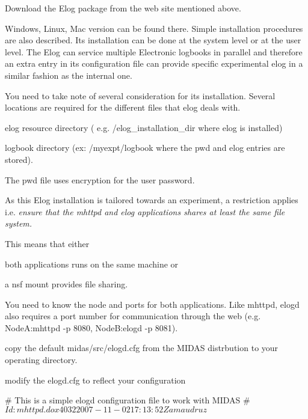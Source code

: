 \begin{DoxyItemize}
\item Download the Elog package from the web site mentioned above. 
\begin{DoxyItemize}
\item Windows, Linux, Mac version can be found there. Simple installation procedures are also described. Its installation can be done at the system level or at the user level. The Elog can service multiple Electronic logbooks in parallel and therefore an extra entry in its configuration file can provide specific experimental elog in a similar fashion as the internal one.


\item You need to take note of several consideration for its installation. Several locations are required for the different files that elog deals with. 
\begin{DoxyItemize}
\item elog resource directory ( e.g. /elog\_\-installation\_\-dir where elog is installed) 
\item logbook directory (ex: /myexpt/logbook where the pwd and elog entries are stored). 
\end{DoxyItemize}
\item The pwd file uses encryption for the user password. 
\item As this Elog installation is tailored towards an experiment, a restriction applies i.e. {\itshape  ensure that the mhttpd and elog applications shares at least the same file system.\/} \par
This means that either 
\begin{DoxyItemize}
\item both applications runs on the same machine or 
\item a nsf mount provides file sharing. 
\end{DoxyItemize}
\item You need to know the node and ports for both applications. Like mhttpd, elogd also requires a port number for communication through the web (e.g. NodeA:mhttpd -\/p 8080, NodeB:elogd -\/p 8081).
\begin{DoxyEnumerate}
\item copy the default midas/src/elogd.cfg from the MIDAS distrbution to your operating directory.
\item modify the elogd.cfg to reflect your configuration 
\begin{DoxyCode}
  # This is a simple elogd configuration file to work with MIDAS
  # $Id: mhttpd.dox 4032 2007-11-02 17:13:52Z amaudruz $ 


\end{DoxyCode}
\end{DoxyEnumerate}
\end{DoxyItemize}
\end{DoxyItemize}

